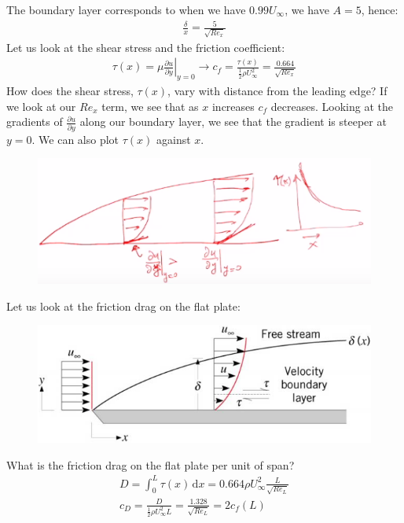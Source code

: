 \documentclass[class=report, crop=false, 12pt,a4paper]{standalone}
\begin{document}
The boundary layer corresponds to when we have $0.99 U_\infty$, we have $A = 5$, hence:
\begin{align}
  \frac{\delta}{x} = \frac{5}{\sqrt{Re_x}}
\end{align}
Let us look at the shear stress and the friction coefficient:
\begin{align}
  \tau (x) = \mu \left. \frac{\partial u}{\partial y}\right|_{y=0} \rightarrow c_f = \frac{\tau (x)}{\frac{1}{2}\rho U^2_\infty} = \frac{0.664}{\sqrt{Re_x}}
\end{align}
How does the shear stress, $\tau (x)$, vary with distance from the leading edge? If we look at our $Re_x$ term, we see that as $x$ increases $c_f$ decreases. Looking at the gradients of $\frac{\partial u}{\partial y}$ along our boundary layer, we see that the gradient is steeper at $y = 0$. We can also plot $\tau (x)$ against $x$.
\begin{figure}[H]
  \centering
  \includegraphics[width = 0.8 \textwidth]{../img/diagram69.png}
  \caption{}
\end{figure}
Let us look at the friction drag on the flat plate:
\begin{figure}[H]
  \centering
  \includegraphics[width = 0.8 \textwidth]{../img/diagram70.png}
  \caption{}
\end{figure}
What is the friction drag on the flat plate per unit of span?
\begin{align}
  D = \int_{0}^{L} \tau(x) \,\mathrm{d}x = 0.664 \rho U_\infty^2 \frac{L}{\sqrt{Re_L}}\\
  c_D = \frac{D}{\frac{1}{2}\rho U_\infty^2 L} = \frac{1.328}{\sqrt{Re_L}} = 2 c_f (L)
\end{align}
\end{document}
